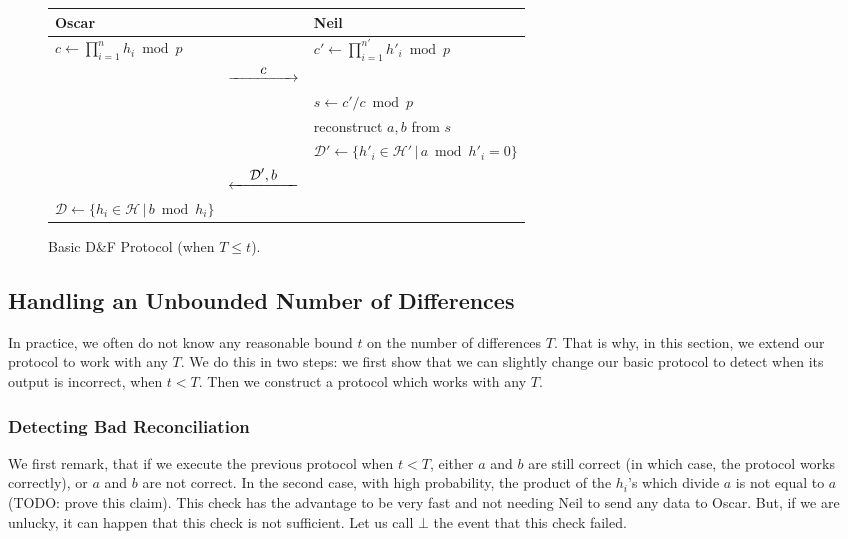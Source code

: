 \documentclass[11pt]{llncs}
\newcommand{\Set}{\mathcal{H}}
\newcommand{\SetD}{\mathcal{D}}
\newcommand{\df}{D\&F\xspace}
\newcommand{\Rflow}[1]{\stackrel{\displaystyle #1}{\hbox to 5em{\rightarrowfill}}}
\newcommand{\Lflow}[1]{\stackrel{\displaystyle #1}{\hbox to 5em{\leftarrowfill}}}
\begin{document}
\begin{figure}
\centering
\setlength{\tabcolsep}{6pt}
\begin{tabular}{lcl}
\toprule
\textbf{Oscar}                    &                        & \textbf{Neil}\\
\midrule
$c \gets \prod_{i=1}^n h_i \bmod p$        &                & $c' \gets \prod_{i=1}^{n'} h'_i \bmod p$ \\
                                  & $\Rflow{c}$            & \\
                                  &                        & $s \gets c'/c \bmod p$ \\
                                  &                        & reconstruct  $a,b$ from $s$\\
                                  &                        & $\SetD' \gets \{ h'_i \in \Set' \,|\, a \bmod h'_i = 0 \}$ \\
                                  & $\Lflow{\SetD',b}$     & \\
$\SetD \gets \{ h_i \in \Set \,|\, b \bmod h_i \}$ & & \\
\bottomrule
\end{tabular}
\caption{Basic \df Protocol (when $T \le t$).}\label{fig:basic-df}
\end{figure}

\subsection{Handling an Unbounded Number of Differences}

In practice, we often do not know any reasonable bound $t$ on the number of differences $T$.
That is why, in this section, we extend our protocol to work with any $T$.
We do this in two steps: we first show that we can slightly change our basic protocol to detect when its output is incorrect, when $t < T$. 
Then we construct a protocol which works with any $T$.

\subsubsection{Detecting Bad Reconciliation}
We first remark, that if we execute the previous protocol when $t < T$, either $a$ and $b$ are still correct (in which case, the protocol works correctly), or $a$ and $b$ are not correct.
In the second case, with high probability, the product of the $h_i$'s which divide $a$ is not equal to $a$ (TODO: prove this claim).
This check has the advantage to be very fast and not needing Neil to send any data to Oscar.
But, if we are unlucky, it can happen that this check is not sufficient.
Let us call $\bot$ the event that this check failed.
\end{document}

